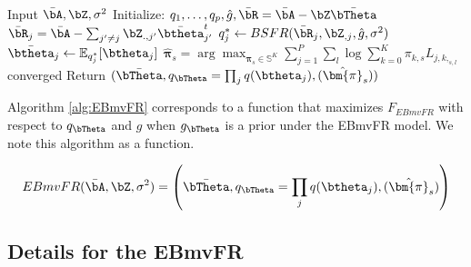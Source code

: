  

 



\begin{algorithm}
\caption{ Coordinate ascent for fitting EBmvFR (known $\sigma^2$)} \label{alg:EBmvFR}
\begin{algorithmic}[1]
 \STATE Input  $\bar{\bA} , \bZ,\sigma^2$ 
 \STATE Initialize: $q_1,\ldots, q_p, \hat{g},\bar{\bR} = \Bar{\bA} - \bZ\Bar{ \bTheta }$
\REPEAT 
{}
\STATE  $\bar{\bR}_{j} = \bar{\bA}-\sum_{j'\ne j}\bZ_{.,j'}\bar{\btheta}_{j'}^t$ 
\STATE  $q_j^* \leftarrow BSFR(\bar{\bR}_{j},\bZ_{,j}, \hat{g},\sigma^2)$
\STATE  $\bar{\btheta}_j\leftarrow\mathbb E_{q_j^*}[\btheta_j]$
\ENDFOR
{}
\STATE$\hat{\bm{\pi}}_s = \arg\max_{\bm{\pi}_s \in \mathbb{S}^K} \sum _{j=1}^P \sum_{l} \log  \sum_{k=0}^K  \pi_{k,s}L_{j,k,_{s,l}}$
\ENDFOR
\UNTIL converged
\STATE Return $(\Bar{ \bTheta }, q_{\bTheta}=\prod_j q(\btheta_j ), (\hat{\bm{\pi}}_s))$
\end{algorithmic}
\end{algorithm}


Algorithm \ref{alg:EBmvFR} corresponds to a function that maximizes $F_{EBmvFR}$ with respect to $q_{\bTheta} $ and $g$ when $g_{\bTheta} $ is a prior under the EBmvFR model. We note this algorithm as a function. 


 
\begin{align}
    EBmvFR(\Bar{\bA}, \bZ, \sigma^2) =\left(\Bar{ \bTheta }, q_{\bTheta}=\prod_j q(\btheta_j ),(\hat{\bm{\pi}}_s) \right)
\end{align}

\subsection{Details for the EBmvFR}\label{subsec:detalEBmvFR}
 



